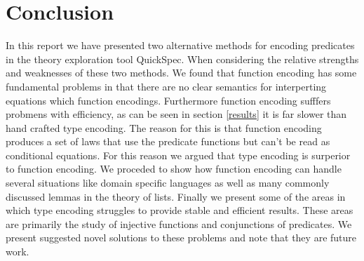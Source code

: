 \section{Conclusion}
In this report we have presented two 
alternative methods for encoding predicates
in the theory exploration tool QuickSpec.
When considering the relative strengths and weaknesses
of these two methods. We found that function encoding has
some fundamental problems in that there are no clear
semantics for interperting equations which function encodings.
Furthermore function encoding sufffers probmens with efficiency,
as can be seen in section \ref{results} it is far slower
than hand crafted type encoding. The reason for this is that 
function encoding produces a set of laws that use the predicate
functions but can't be read as conditional equations.
For this reason we argued that type encoding is surperior
to function encoding. We proceded to show how function encoding
can handle several situations like domain specific languages
as well as many commonly discussed lemmas in the theory
of lists. Finally we present some of the areas in which
type encoding struggles to provide stable and efficient results.
These areas are primarily the study of injective functions
and conjunctions of predicates. We present suggested novel
solutions to these problems and note that they are future work.
